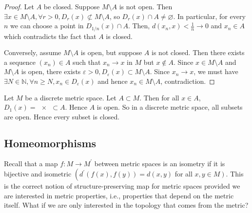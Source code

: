 \documentclass[a4paper,11pt]{article}
\begin{document}
\begin{proof}
	Let \( A \) be closed.
	Suppose \( M \setminus A \) is not open.
	Then \( \exists x \in M \setminus A, \forall r > 0, D_r(x) \not\subset M \setminus A \), so \( D_r(x) \cap A \neq \varnothing \).
	In particular, for every \( n \) we can choose a point in \( D_{1/n}(x) \cap A \).
	Then, \( d(x_n,x) < \frac{1}{n} \to 0 \) and \( x_n \in A \) which contradicts the fact that \( A \) is closed.

	Conversely, assume \( M \setminus A \) is open, but suppose \( A \) is not closed.
	Then there exists a sequence \( (x_n) \in A \) such that \( x_n \to x \) in \( M \) but \( x \not\in A \).
	Since \( x \in M \setminus A \) and \( M \setminus A \) is open, there exists \( \varepsilon > 0, D_\varepsilon(x) \subset M \setminus A \).
	Since \( x_n \to x \), we must have \( \exists N \in \mathbb N, \forall n \geq N, x_n \in D_\varepsilon(x) \) and hence \( x_n \in M \setminus A \), contradiction.
\end{proof}
\begin{example}
	Let \( M \) be a discrete metric space.
	Let \( A \subset M \).
	Then for all \( x \in A \), \( D_1(x) = \qty{x} \subset A \).
	Hence \( A \) is open.
	So in a discrete metric space, all subsets are open.
	Hence every subset is closed.
\end{example}

\subsection{Homeomorphisms}
Recall that a map $f: M \rightarrow M^{\prime}$ between metric spaces is an isometry if it is bijective and isometric $\left(d^{\prime}(f(x), f(y))=d(x, y)\right.$ for all $\left.x, y \in M\right)$. This is the correct notion of structure-preserving map for metric spaces provided we are interested in metric properties, i.e., properties that depend on the metric itself. What if we are only interested in the topology that comes from the metric?
\end{document}
